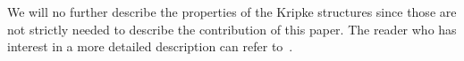 
We will no further describe the properties of the Kripke structures
since those are not strictly needed to describe the contribution of this
paper. The reader who has interest in a more detailed description can refer to~\cite{fagin1994reasoning}.

